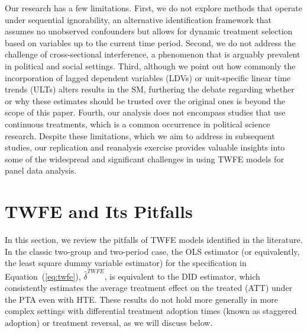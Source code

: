 \documentclass[12pt]{article}
\begin{document}
Our research has a few limitations. First, we do not explore methods that operate under sequential ignorability, an alternative identification framework that assumes no unobserved confounders but allows for dynamic treatment selection based on variables up to the current time period. Second, we do not address the challenge of cross-sectional interference, a phenomenon that is arguably prevalent in political and social settings. Third, although we point out how commonly the incorporation of lagged dependent variables (LDVs) or unit-specific linear time trends (ULTs) alters results in the SM, furthering the debate regarding whether or why these estimates should be trusted over the original ones is beyond the scope of this paper. Fourth, our analysis does not encompass studies that use continuous treatments, which is a common occurrence in political science research. Despite these limitations, which we aim to address in subsequent studies, our replication and reanalysis exercise provides valuable insights into some of the widespread and significant challenges in using TWFE models for panel data analysis.


                                                             

\section{TWFE and Its Pitfalls} 

In this section, we review the pitfalls of TWFE models identified in the literature. In the classic two-group and two-period case, the OLS estimator (or equivalently, the least square dummy variable estimator) for the specification in Equation~(\ref{eq:twfe}), $\hat\delta^{TWFE}$, is equivalent to the DID estimator, which consistently estimates the average treatment effect on the treated (ATT) under the PTA even with HTE. These results do not hold more generally in more complex settings with differential treatment adoption times (known as staggered adoption) or treatment reversal, as we will discuss below.
\end{document}
